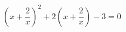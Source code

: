 \begin{ex}[type=equation]
	\begin{condition}
		 $\left(x + \dfrac{2}{x}\right)^2 + 2\left(x +\dfrac{2}{x}\right) -3 = 0$
	\end{condition}
\end{ex}
